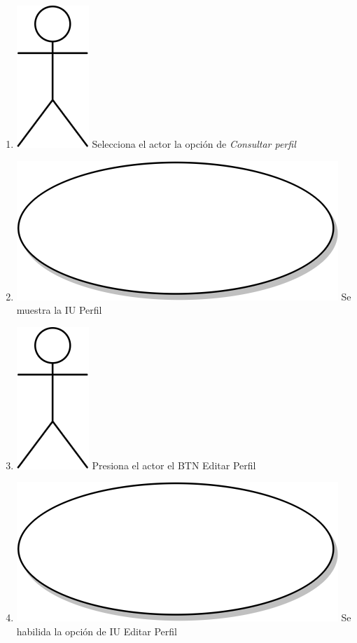\begin{enumerate}
\item {\includegraphics[scale=.1]{Capitulo3/img/actor.png} Selecciona el actor la opción de \textit{Consultar perfil}}
\item {\includegraphics[scale=.05]{Capitulo3/img/proceso.png} Se muestra la IU Perfil}
\item {\includegraphics[scale=.1]{Capitulo3/img/actor.png} Presiona el actor el BTN Editar Perfil }
\item {\includegraphics[scale=.05]{Capitulo3/img/proceso.png} Se habilida la opción de IU Editar Perfil}

\end{enumerate}
